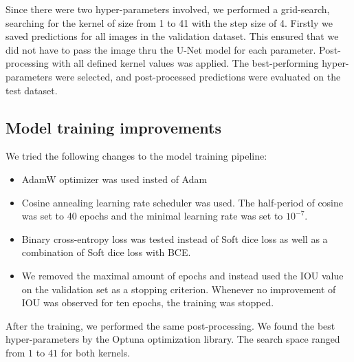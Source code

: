 Since there were two hyper-parameters involved, we performed a grid-search, searching for the kernel of size from 1 to 41 with the step size of 4. Firstly we saved predictions for all images in the validation dataset. This ensured that we did not have to pass the image thru the U-Net model for each parameter. Post-processing with all defined kernel values was applied. The best-performing hyper-parameters were selected, and post-processed predictions were evaluated on the test dataset.

\subsection{Model training improvements}
We tried the following changes to the model training pipeline:
\begin{itemize}
    \item AdamW optimizer was used insted of Adam
    \item Cosine annealing learning rate scheduler was used. The half-period of cosine was set to 40 epochs and the minimal learning rate was set to $10^{-7}$.
    \item Binary cross-entropy loss was tested instead of Soft dice loss as well as a combination of Soft dice loss with BCE.
    \item We removed the maximal amount of epochs and instead used the IOU value on the validation set as a stopping criterion. Whenever no improvement of IOU was observed for ten epochs, the training was stopped.
\end{itemize}

After the training, we performed the same post-processing. We found the best hyper-parameters by the Optuna optimization library. The search space ranged from $1$ to $41$ for both kernels.


